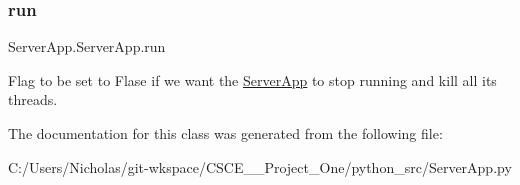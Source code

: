 \subsubsection{\texorpdfstring{run}{run}}
{\footnotesize\ttfamily Server\+App.\+Server\+App.\+run}



Flag to be set to Flase if we want the \mbox{\hyperlink{class_server_app_1_1_server_app}{Server\+App}} to stop running and kill all it\textquotesingle{}s threads. 



The documentation for this class was generated from the following file\+:\begin{DoxyCompactItemize}
\item 
C\+:/\+Users/\+Nicholas/git-\/wkspace/\+C\+S\+C\+E\+\_\+\_\+\+Project\+\_\+\+One/python\+\_\+src/Server\+App.\+py\end{DoxyCompactItemize}

